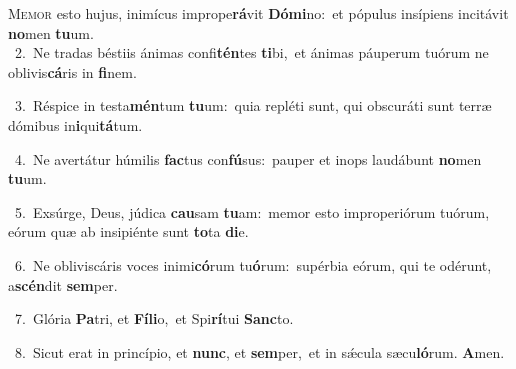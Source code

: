 \lettrine{\initial\textcolor{\initialcolor}{M}}{emor} esto hujus, inimícus imprope\-\textbf{rá}\-vit \textbf{Dó}\-\textbf{mi}no:~\star et pópulus insípiens incitávit \textbf{no}\-men \textbf{tu}\-um.\\
{\numbfont\textcolor{\numbcolor}{~2.}}~Ne tradas béstiis ánimas confi\-\textbf{tén}\-tes \textbf{ti}\-bi,~\star et ánimas páuperum tuórum ne oblivis\-\textbf{cá}\-ris in \textbf{fi}\-nem.\par
{\numbfont\textcolor{\numbcolor}{~3.}}~Réspice in testa\-\textbf{mén}\-tum \textbf{tu}\-um:~\star quia repléti sunt, qui obscuráti sunt terræ dómibus in\-\textbf{i}\-qui\-\textbf{tá}\-tum.\par
{\numbfont\textcolor{\numbcolor}{~4.}}~Ne avertátur húmilis \textbf{fac}\-tus con\-\textbf{fú}\-sus:~\star pauper et inops laudábunt \textbf{no}\-men \textbf{tu}\-um.\par
{\numbfont\textcolor{\numbcolor}{~5.}}~Exsúrge, Deus, júdica \textbf{cau}\-sam \textbf{tu}\-am:~\star memor esto improperiórum tuórum, eórum quæ ab insipiénte sunt \textbf{to}\-ta \textbf{di}\-e.\par
{\numbfont\textcolor{\numbcolor}{~6.}}~Ne obliviscáris voces inimi\-\textbf{có}\-rum tu\-\textbf{ó}\-rum:~\star supérbia eórum, qui te odérunt, a\-\textbf{scén}\-dit \textbf{sem}\-per.\par
{\numbfont\textcolor{\numbcolor}{~7.}}~Glória \textbf{Pa}\-tri, et \textbf{Fí}\-\textbf{li}o,~\star et Spi\-\textbf{rí}\-tui \textbf{Sanc}\-to.\par
{\numbfont\textcolor{\numbcolor}{~8.}}~Sicut erat in princípio, et \textbf{nunc}\-, et \textbf{sem}\-per,~\star et in sǽcula sæcu\-\textbf{ló}\-rum. \textbf{A}\-men.\par
